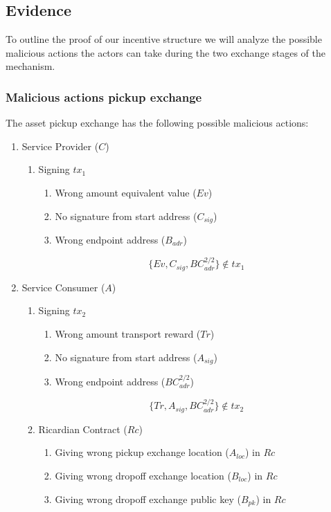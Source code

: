 \subsection{Evidence}

To outline the proof of our incentive structure we will analyze the possible malicious actions the actors can take during the two exchange stages of the mechanism.

\subsubsection{Malicious actions pickup exchange}

The asset pickup exchange has the following possible malicious actions:
\begin{enumerate}
  \item Service Provider ($C$)
  \begin{enumerate}
    \item Signing $tx_1$
    \begin{enumerate}
      \item Wrong amount equivalent value ($Ev$)
      \item No signature from start address ($C_{sig}$)
      \item Wrong endpoint address ($B_{adr}$)
    \end{enumerate}
    \[\{Ev, C_{sig}, BC_{adr}^{2/2}\}\not\in tx_1\]
  \end{enumerate}
  \item Service Consumer ($A$)
  \begin{enumerate}
    \item Signing $tx_2$
    \begin{enumerate}
      \item Wrong amount transport reward ($Tr$)
      \item No signature from start address ($A_{sig}$)
      \item Wrong endpoint address ($BC_{adr}^{2/2}$)
    \end{enumerate}
    \[\{Tr, A_{sig}, BC_{adr}^{2/2}\}\not\in tx_2\]
    \item Ricardian Contract ($Rc$)
    \begin{enumerate}
      \item Giving wrong pickup exchange location ($A_{loc}$) in $Rc$
      \item Giving wrong dropoff exchange location ($B_{loc}$) in $Rc$
      \item Giving wrong dropoff exchange public key ($B_{pk}$) in $Rc$

\end{enumerate}
\end{enumerate}
\end{enumerate}
